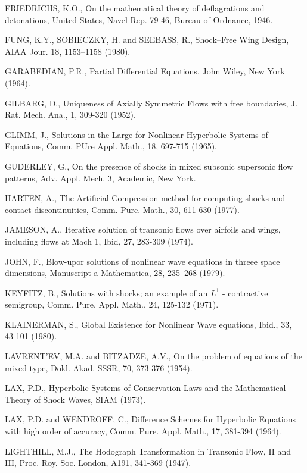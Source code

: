 \begin{thebibliography}{99}
 FRIEDRICHS, K.O., On the mathematical theory of deflagrations and detonations, United States, Navel Rep. 79-46, Bureau of Ordnance, 1946.

 FUNG, K.Y., SOBIECZKY, H. and SEEBASS, R., Shock--Free Wing Design, AIAA Jour. 18, 1153--1158 (1980).

 GARABEDIAN, P.R., Partial Differential Equations, John Wiley, New York (1964).

 GILBARG, D., Uniqueness of Axially Symmetric Flows with free boundaries, J. Rat. Mech. Ana., 1, 309-320 (1952). 

 GLIMM, J., Solutions in the Large for Nonlinear Hyperbolic Systems of Equations, Comm. PUre Appl. Math., 18, 697-715 (1965).

 GUDERLEY, G., On the presence of shocks in mixed subsonic supersonic flow patterns, Adv. Appl. Mech. 3, Academic, New York.

 HARTEN, A., The Artificial Compression method for computing shocks and contact discontinuities, Comm. Pure. Math., 30, 611-630 (1977).

 JAMESON, A., Iterative solution of transonic flows over airfoils and wings, including flows at Mach 1, Ibid, 27, 283-309 (1974).

 JOHN, F., Blow-up\pageoriginale or solutions of nonlinear wave equations in threee space dimensions, Manuscript a Mathematica, 28, 235--268 (1979).

 KEYFITZ, B., Solutions with shocks; an example of an $L^1$ - contractive semigroup, Comm. Pure. Appl. Math., 24, 125-132 (1971).

 KLAINERMAN, S., Global Existence for Nonlinear Wave equations, Ibid., 33, 43-101 (1980).

 LAVRENT'EV, M.A. and BITZADZE, A.V., On the problem of equations of the mixed type, Dokl. Akad. SSSR, 70, 373-376 (1954). 

 LAX, P.D., Hyperbolic Systems of Conservation Laws and the Mathematical Theory of Shock Waves, SIAM (1973). 

 LAX, P.D. and WENDROFF, C., Difference Schemes for Hyperbolic Equations with high order of accuracy, Comm. Pure. Appl. Math., 17, 381-394 (1964).

 LIGHTHILL, M.J., The Hodograph Transformation in Transonic Flow, II and III, Proc. Roy. Soc. London, A191, 341-369 (1947).


\end{thebibliography}

